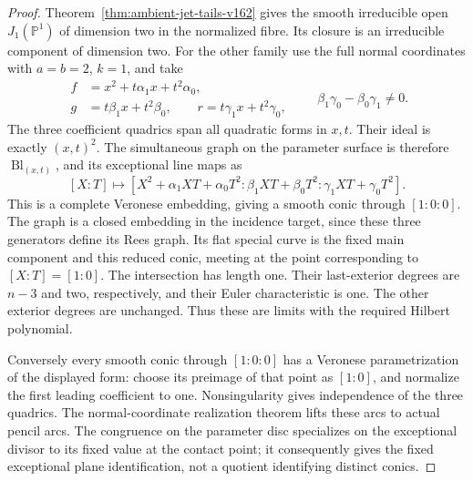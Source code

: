 \documentclass[11pt,reqno]{amsart}
\numberwithin{equation}{section}
\theoremstyle{definition}\newtheorem{definition}[theorem]{Definition}
\theoremstyle{remark}\newtheorem{remark}[theorem]{Remark}
\newcommand{\Pj}{\mathbb P}\newcommand{\A}{\mathbb A}
\begin{document}
\begin{proof}
Theorem~\ref{thm:ambient-jet-tails-v162} gives the smooth irreducible
open $J_1(\Pj^1)$ of dimension two in the normalized fibre. Its
closure is an irreducible component of dimension two.
For the other family use the full normal coordinates with $a=b=2$,
$k=1$, and take
\begin{equation}\label{eq:conic-arcs-v162}
 \begin{split}
 f&=x^2+t\alpha_1x+t^2\alpha_0,\\
 g&=t\beta_1x+t^2\beta_0,\qquad
 r=t\gamma_1x+t^2\gamma_0,
 \end{split}\qquad
       \beta_1\gamma_0-\beta_0\gamma_1\ne0.
\end{equation}
The three coefficient quadrics span all quadratic forms in $x,t$.
Their ideal is exactly $(x,t)^2$. The simultaneous graph on the
parameter surface is therefore $\operatorname{Bl}_{(x,t)}$, and
its exceptional line maps as
\begin{equation}\label{eq:conic-tail-v162}
 [X:T]\longmapsto
 [X^2+\alpha_1XT+\alpha_0T^2:
             \beta_1XT+\beta_0T^2:
             \gamma_1XT+\gamma_0T^2].
\end{equation}
This is a complete Veronese embedding, giving a smooth conic
through $[1:0:0]$. The graph is a closed embedding in the incidence
target, since these three generators define its Rees graph. Its
flat special curve is the fixed main component and this reduced
conic, meeting at the point corresponding to $[X:T]=[1:0]$.
The intersection has length one. Their last-exterior degrees are
$n-3$ and two, respectively, and their Euler characteristic is one.
The other exterior degrees are unchanged. Thus these are limits
with the required Hilbert polynomial.

Conversely every smooth conic through $[1:0:0]$ has a Veronese
parametrization of the displayed form: choose its preimage of that
point as $[1:0]$, and normalize the first leading coefficient to
one. Nonsingularity gives independence of the three quadrics.
The normal-coordinate realization theorem lifts these arcs to
actual pencil arcs. The congruence on the parameter disc specializes
on the exceptional divisor to its fixed value at the contact point;
it consequently gives the fixed exceptional plane identification,
not a quotient identifying distinct conics.


\end{proof}
\end{document}
